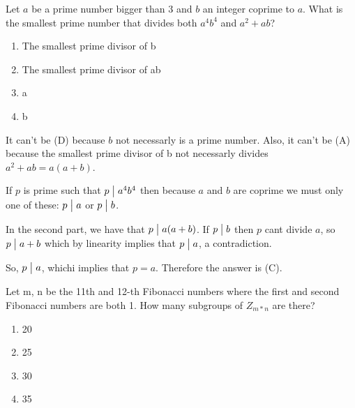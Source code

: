 \documentclass[12pt]{report}
\theoremstyle{largebreak}
\newcommand\divides{\ensuremath{\bigm|}}
\begin{document}
    \begin{excer}
        Let \(a\) be a prime number bigger than 3 and \(b\) an integer coprime to \(a\). What is the smallest prime number that divides both \(a^4 b^4\) and \(a^2+ab\)?
        \begin{enumerate}[label = \textit{(\Alph*)}]
            \item The smallest prime divisor of b
            \item The smallest prime divisor of ab
            \item a
            \item b
        \end{enumerate}
    \end{excer}

    \begin{sol}
        It can't be (D) because $b$ not necessarly is a prime number. Also, it can't be (A) because the smallest prime divisor of b not necessarly divides $a^2+ab=a(a+b)$.

        If $p$ is prime such that $p\divides a^4b^4$ then because $a$ and $b$ are coprime we must only one of these: $p\divides a$ or $p\divides b$.

        In the second part, we have that $p\divides a(a+b)$. If $p\divides b$ then $p$ cant divide $a$, so $p\divides a+b$ which by linearity implies that $p\divides a$, a contradiction.

        So, $p\divides a$, whichi implies that $p=a$. Therefore the answer is (C).

    \end{sol}

    \begin{excer}
        Let m, n be the 11th and 12-th Fibonacci numbers where the first and second Fibonacci numbers are both 1. How many subgroups of $Z_{m*n}$ are there?
        \begin{enumerate}[label = \textit{(\Alph*)}]
            \item 20
            \item 25
            \item 30
            \item 35
        \end{enumerate}
    \end{excer}
\end{document}
